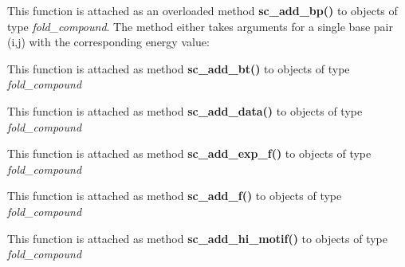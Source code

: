 \begin{DoxyRefList}
This function is attached as an overloaded method {\bfseries{sc\+\_\+add\+\_\+bp()}} to objects of type {\itshape fold\+\_\+compound}. The method either takes arguments for a single base pair (i,j) with the corresponding energy value\+:  
\item[Global \mbox{\hyperlink{group__soft__constraints_gabde7d07a79bb9a8f4721aee247b674ea}{vrna\+\_\+sc\+\_\+add\+\_\+bt}} (vrna\+\_\+fold\+\_\+compound\+\_\+t $\ast$vc, vrna\+\_\+callback\+\_\+sc\+\_\+backtrack $\ast$f)]\label{wrappers__wrappers000041}%
%
 This function is attached as method {\bfseries{sc\+\_\+add\+\_\+bt()}} to objects of type {\itshape fold\+\_\+compound}  
\item[Global \mbox{\hyperlink{group__soft__constraints_ga15c6d52471ec97897e2bb7f964f5deb6}{vrna\+\_\+sc\+\_\+add\+\_\+data}} (vrna\+\_\+fold\+\_\+compound\+\_\+t $\ast$vc, void $\ast$data, vrna\+\_\+callback\+\_\+free\+\_\+auxdata $\ast$free\+\_\+data)]\label{wrappers__wrappers000039}%
%
 This function is attached as method {\bfseries{sc\+\_\+add\+\_\+data()}} to objects of type {\itshape fold\+\_\+compound}  
\item[Global \mbox{\hyperlink{group__soft__constraints_ga87e382b5d0c9b7d9ce1b79c0473ff700}{vrna\+\_\+sc\+\_\+add\+\_\+exp\+\_\+f}} (vrna\+\_\+fold\+\_\+compound\+\_\+t $\ast$vc, vrna\+\_\+callback\+\_\+sc\+\_\+exp\+\_\+energy $\ast$exp\+\_\+f)]\label{wrappers__wrappers000042}%
%
 This function is attached as method {\bfseries{sc\+\_\+add\+\_\+exp\+\_\+f()}} to objects of type {\itshape fold\+\_\+compound}  
\item[Global \mbox{\hyperlink{group__soft__constraints_ga8c7d907ec0125cd61c04e0908010a4e9}{vrna\+\_\+sc\+\_\+add\+\_\+f}} (vrna\+\_\+fold\+\_\+compound\+\_\+t $\ast$vc, vrna\+\_\+callback\+\_\+sc\+\_\+energy $\ast$f)]\label{wrappers__wrappers000040}%
%
 This function is attached as method {\bfseries{sc\+\_\+add\+\_\+f()}} to objects of type {\itshape fold\+\_\+compound}  
\item[Global \mbox{\hyperlink{group__constraints__ligand_gaa6ff0113a3a76dc0b8d62961f4e1dfa0}{vrna\+\_\+sc\+\_\+add\+\_\+hi\+\_\+motif}} (vrna\+\_\+fold\+\_\+compound\+\_\+t $\ast$vc, const char $\ast$seq, const char $\ast$structure, F\+L\+T\+\_\+\+O\+R\+\_\+\+D\+BL energy, unsigned int options)]\label{wrappers__wrappers000029}%
%
 This function is attached as method {\bfseries{sc\+\_\+add\+\_\+hi\+\_\+motif()}} to objects of type {\itshape fold\+\_\+compound}  

\end{DoxyRefList}
